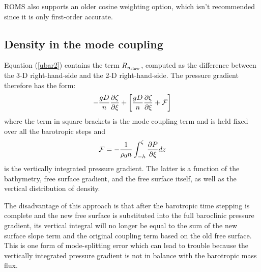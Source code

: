 ROMS also supports an older cosine weighting option, which isn't
recommended since it is only first-order accurate.

\subsection{Density in the mode coupling}

Equation (\ref{ubar2}) contains the term $R_{u_{\rm slow}}$,
computed as the difference between the 3-D right-hand-side and the
2-D right-hand-side. The pressure gradient therefore has the form:
\begin{equation}
   -\frac{g D}{n} \frac{\partial \zeta}{\partial \xi} +
   \left[\frac{g D}{n} \frac{\partial \zeta}{\partial \xi} + {\cal F}
   \right]
\end{equation}
where the term in square brackets is the mode coupling term and is
held fixed over all the barotropic steps and
\begin{equation}
  {\cal F} = - \frac{1}{\rho_0 n} \int_{-h}^\zeta \frac{\partial
  P}{\partial \xi} dz
\end{equation}
is the vertically integrated pressure gradient. The latter is a function
of the bathymetry, free surface gradient, and the free surface itself,
as well as the vertical distribution of density.

The disadvantage of this approach is that after the barotropic time
stepping is complete and the new free surface is substituted into
the full baroclinic pressure gradient, its vertical integral will
no longer be equal to the sum of the new surface slope term and the
original coupling term based on the old free surface. This is one
form of mode-splitting error which can lead to trouble because the
vertically integrated pressure gradient is not in balance with the
barotropic mass flux.


